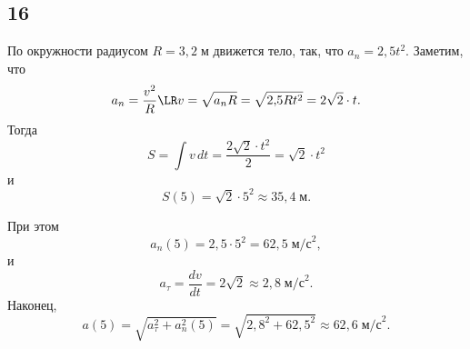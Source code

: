 \subsection{16}

По окружности радиусом $R=3{,}2\;\text{м}$ движется тело, так, что $a_n=2{,}5t^2$. Заметим, что
\[
a_n=\frac{v^2}{R}\LR v=\sqrt{a_nR}=\sqrt{2{,}5Rt^2}=2\sqrt{2}\cdot t.
\]
Тогда
\[
S=\int v\,dt=\frac{2\sqrt{2}\cdot t^2}{2}=\sqrt{2}\cdot t^2
\]
и
\[
S(5)=\sqrt2\cdot5^2\approx35{,}4\;\text{м}.
\]

При этом
\[
a_n(5)=2{,}5\cdot5^2=62{,}5\;\text{м/с}^2,
\]
и
\[
a_\tau=\frac{dv}{dt}=2\sqrt{2}\approx2{,}8\;\text{м/с}^2.
\]
Наконец,
\[
a(5)=\sqrt{a^2_\tau+a^2_n(5)}=\sqrt{2{,}8^2+62{,}5^2}\approx62{,}6\;\text{м/с}^2.
\]
